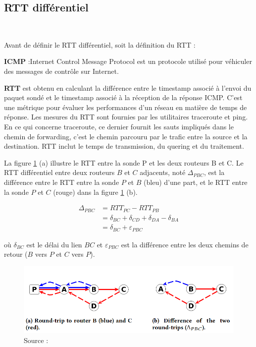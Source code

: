 \subsection{RTT différentiel }~

Avant de définir le RTT différentiel, soit la définition du RTT :


\begin{tcolorbox}
	
	\textbf{ICMP} :Internet Control Message Protocol est un protocole utilisé pour véhiculer des messages de contrôle sur Internet.
	
	\textbf{RTT} est obtenu en calculant la différence entre le timestamp associé à l'envoi du paquet sondé  et le timestamp associé à la réception de la réponse ICMP. C'est une métrique pour évaluer les performances d'un réseau en matière de temps de réponse. Les mesures du RTT sont fournies par les utilitaires traceroute et ping. En ce qui concerne traceroute,  ce dernier fournit les sauts impliqués dans le  chemin de forwarding, c'est le chemin parcouru par le trafic entre la source et la destination.  RTT inclut le temps de transmission, du quering et  du traitement. 
\end{tcolorbox}

La figure 	\ref{fig:rtt-differ} (a)  illustre le RTT entre la sonde P et les deux routeurs B et C. Le RTT différentiel  entre deux routeurs $B$ et $C$ adjacents, noté $\Delta_{PBC}$, est la différence entre le RTT entre la sonde $P$ et $B$ (bleu) d'une part, et le RTT entre la sonde $P$ et $C$ (rouge) dans la figure 	\ref{fig:rtt-differ} (b). 

\begin{align*}
\Delta_{PBC} &= RTT_{PC} - RTT_{PB} \\
&= \delta_{BC} + \delta_{CD} + \delta_{DA}  - \delta_{BA} \\
&= \delta_{BC} + \varepsilon_{PBC}
\end{align*}

où $\delta_{BC}$ est le délai du lien $BC$ et $\varepsilon_{PBC}$ est la différence entre les deux chemins de retour ($B$ vers $P$ et $C$ vers $P$). 
\begin{figure}[H]
	\centering
	\includegraphics[width=0.7\linewidth]{illustrations/rtt-differ}
	\caption{Source : \cite{DBLP:journals/corr/FontugneAPB16}}
	\label{fig:rtt-differ}
\end{figure}

